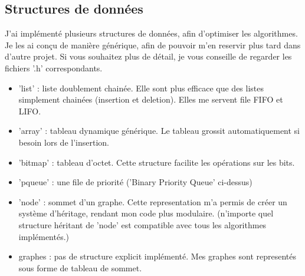 \documentclass[10pt]{article}
\begin{document}
		\subsection{Structures de données}
		J'ai implémenté plusieurs structures de données, afin d'optimiser les algorithmes. Je les ai conçu de manière générique,
		afin de pouvoir m'en reservir plus tard dans d'autre projet. Si vous souhaitez plus de détail, je vous
		conseille de regarder les fichiers '.h' correspondants.
		\begin{itemize}[label=-]

			\item 'list'   : liste doublement chainée. Elle sont plus efficace que des listes simplement chainées
			(insertion et deletion). Elles me servent file FIFO et LIFO.
			
			\item 'array'  : tableau dynamique générique. Le tableau grossit automatiquement si besoin lors de l'insertion.
			
			\item 'bitmap' : tableau d'octet. Cette structure facilite les opérations sur les bits.
			
			\item 'pqueue' : une file de priorité ('Binary Priority Queue' ci-dessus)
			
			\item 'node'   : sommet d'un graphe. Cette representation m'a permis de créer un système d'héritage, rendant
			mon code plus modulaire. (n'importe quel structure héritant de 'node' est compatible avec tous les algorithmes implémentés.)
			
			\item graphes  : pas de structure explicit implémenté. Mes graphes sont
			representés sous forme de tableau de sommet.
			
		\end{itemize}
		
\end{document}
